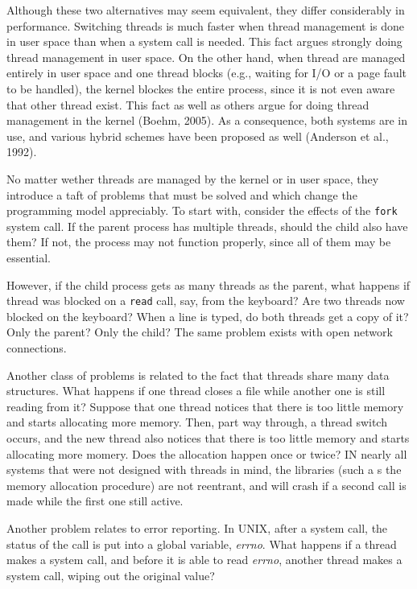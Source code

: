 \documentclass{book}
\newcommand {\sys} [1] {\textsl{#1}}
\newcommand {\cmd} [1] {\texttt{#1}}
\begin{document}
Although these two alternatives may seem equivalent, they differ considerably in performance.
Switching threads is much faster when thread management is done in user space than when a system call is needed.
This fact argues strongly doing thread management in user space.
On the other hand, when thread are managed entirely in user space and one thread blocks (e.g., waiting for I/O or a page fault to be handled),
the kernel blockes the entire process, since it is not even aware that other thread exist.
This fact as well as others argue for doing thread management in the kernel (Boehm, 2005).
As a consequence, both systems are in use, and various hybrid schemes have been proposed as well (Anderson et al., 1992).

No matter wether threads are managed by the kernel or in user space, they introduce a taft of problems
that must be solved and which change the programming model appreciably.
To start with, consider the effects of the \cmd{fork} system call.
If the parent process has multiple threads, should the child also have them?
If not, the process may not function properly, since all of them may be essential.

However, if the child process gets as many threads as the parent, 
what happens if thread was blocked on a \cmd{read} call, say, from the keyboard?
Are two threads now blocked on the keyboard?
When a line is typed, do both threads get a copy of it?
Only the parent?
Only the child?
The same problem exists with open network connections.

Another class of problems is related to the fact that threads share many data structures.
What happens if one thread closes a file while another one is still reading from it?
Suppose that one thread notices that there is too little memory and starts allocating more memory.
Then, part way through, a thread switch occurs, 
and the new thread also notices that there is too little memory and starts allocating more momery.
Does the allocation happen once or twice?
IN nearly all systems that were not designed with threads in mind,
the libraries (such a s the memory allocation procedure) are not reentrant,
and will crash if a second call is made while the first one still active.

Another problem relates to error reporting.
In UNIX, after a system call, the status of the call is put into a global variable, \sys{errno}.
What happens if a thread makes a system call, and before it is able to read \sys{errno},
another thread makes a system call, wiping out the original value?
\end{document}
